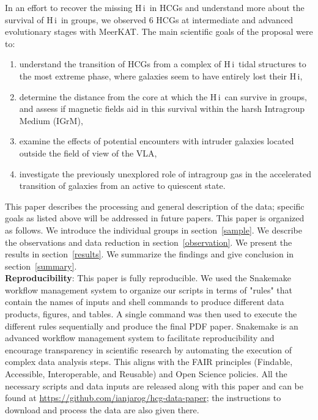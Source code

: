 \documentclass{aa}
\newcommand{\HI}{H\,{\sc i}}
\begin{document}
In an effort to recover the missing \HI\ in HCGs and understand more about the survival of \HI\ in groups, we observed 6 HCGs at intermediate and advanced 
evolutionary stages with MeerKAT. The main scientific goals of the proposal were to:
\begin{enumerate}[label=\alph*)]
    \item understand the transition of HCGs from a complex of \HI\ tidal structures to the most extreme phase, where galaxies seem to have entirely lost their \HI,
    \item determine the distance from the core at which the \HI\ can survive in groups, and assess if magnetic fields aid in this survival within the harsh Intragroup Medium (IGrM),
    \item examine the effects of potential encounters with intruder galaxies located outside the field of view of the VLA,
    \item investigate the previously unexplored role of intragroup gas in the accelerated transition of galaxies from an active to quiescent state.
\end{enumerate}   
This paper describes the processing and general description of the data; specific goals as listed above will be addressed in future papers. 
This paper is organized as follows. We introduce the individual groups in section~\ref{sample}. We describe the observations and data reduction in section~\ref{observation}. 
We present the results in section~\ref{results}. We summarize the findings and give conclusion in section~\ref{summary}.
\\

\textbf{Reproducibility}: This paper is fully reproducible. We used the Snakemake workflow management system \citet{snakemake} to organize our scripts in terms of "rules" that contain the names of inputs and shell 
commands to produce different data products, figures, and tables. A single command was then used to execute the different rules sequentially and produce the final PDF paper. Snakemake is an advanced workflow management system to facilitate reproducibility and encourage transparency in scientific research by automating the execution of complex data analysis steps. This aligns with the FAIR principles (Findable, Accessible, Interoperable, and Reusable) and Open Science policies. All the necessary scripts and data inputs are released along with this paper and can be found at \url{https://github.com/ianjarog/hcg-data-paper}; the instructions to download and process the data are also given there.  
\end{document}
